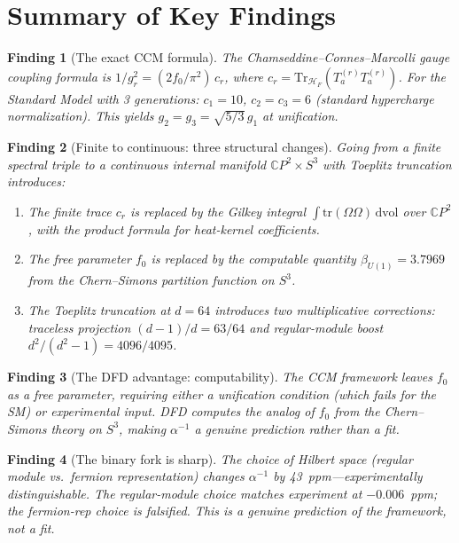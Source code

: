 \documentclass[12pt,a4paper]{article}
\newtheorem{finding}{Finding}
\begin{document}
\section{Summary of Key Findings}
\label{sec:findings}

\begin{finding}[The exact CCM formula]
The Chamseddine--Connes--Marcolli gauge coupling formula is
$1/g_r^2 = (2f_0/\pi^2)\,c_r$, where $c_r = \mathrm{Tr}_{\mathcal{H}_F}(T^{(r)}_a T^{(r)}_a)$.
For the Standard Model with 3 generations: $c_1 = 10$, $c_2 = c_3 = 6$
(standard hypercharge normalization).  This yields $g_2 = g_3 = \sqrt{5/3}\,g_1$
at unification.
\end{finding}

\begin{finding}[Finite to continuous: three structural changes]
Going from a finite spectral triple to a continuous internal manifold
$\mathbb{C}P^2 \times S^3$ with Toeplitz truncation introduces:
\begin{enumerate}[nosep]
\item The finite trace $c_r$ is replaced by the Gilkey integral
  $\int \mathrm{tr}(\Omega\Omega)\,\mathrm{dvol}$ over $\mathbb{C}P^2$,
  with the product formula for heat-kernel coefficients.
\item The free parameter $f_0$ is replaced by the computable quantity
  $\beta_{U(1)} = 3.7969$ from the Chern--Simons partition function
  on $S^3$.
\item The Toeplitz truncation at $d = 64$ introduces two multiplicative
  corrections: traceless projection $(d{-}1)/d = 63/64$ and
  regular-module boost $d^2/(d^2{-}1) = 4096/4095$.
\end{enumerate}
\end{finding}

\begin{finding}[The DFD advantage: computability]
The CCM framework leaves $f_0$ as a free parameter, requiring either
a unification condition (which fails for the SM) or experimental input.
DFD computes the analog of $f_0$ from the Chern--Simons theory on $S^3$,
making $\alpha^{-1}$ a genuine prediction rather than a fit.
\end{finding}

\begin{finding}[The binary fork is sharp]
The choice of Hilbert space (regular module vs.\ fermion representation)
changes $\alpha^{-1}$ by 43~ppm---experimentally distinguishable.
The regular-module choice matches experiment at $-0.006$~ppm; the
fermion-rep choice is falsified.  This is a genuine prediction of the
framework, not a fit.
\end{finding}
\end{document}
